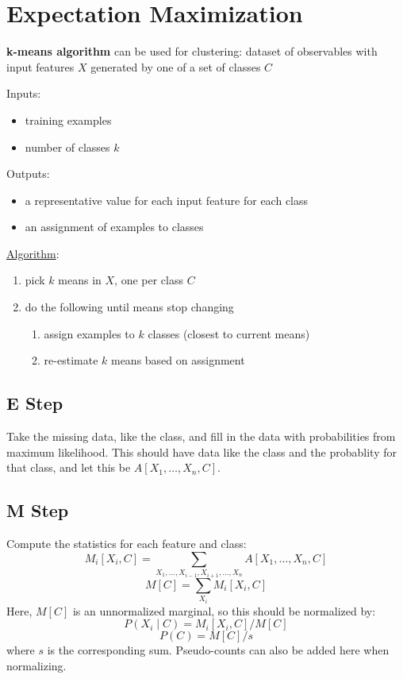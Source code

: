 \documentclass[11pt]{article}
\begin{document}
\section{Expectation Maximization}
\label{sec:org62a3a18}
\textbf{k-means algorithm} can be used for clustering: dataset of observables with input
features \(X\) generated by one of a set of classes \(C\)

Inputs:
\begin{itemize}
\item training examples
\item number of classes \(k\)
\end{itemize}

Outputs:
\begin{itemize}
\item a representative value for each input feature for each class
\item an assignment of examples to classes
\end{itemize}

\uline{Algorithm}:
\begin{enumerate}
\item pick \(k\) means in \(X\), one per class \(C\)
\item do the following until means stop changing
\begin{enumerate}
\item assign examples to \(k\) classes (closest to current means)
\item re-estimate \(k\) means based on assignment
\end{enumerate}
\end{enumerate}
\subsection{E Step}
\label{sec:orgb1f780b}
Take the missing data, like the class, and fill in the data with probabilities from
maximum likelihood.
This should have data like the class and the probablity for that class, and let
this be \(A[X_{1}, \dots, X_{n}, C]\).
\subsection{M Step}
\label{sec:org69c1fd5}
Compute the statistics for each feature and class:
$$ M_{i}[X_{i}, C] = \sum_{X_{1}, \dots, X_{i-1},X_{i+1}, \dots, X_{n}} A[X_{1}, \dots, X_{n}, C] $$
$$ M[C] = \sum_{X_{i}} M_{i} [X_{i}, C] $$
Here, \(M[C]\) is an unnormalized marginal, so this should be normalized by:
$$ P(X_{i} \mid C) = M_{i}[X_{i}, C] / M[C] $$
$$ P(C) = M[C] / s $$
where \(s\) is the corresponding sum.
Pseudo-counts can also be added here when normalizing.
\end{document}
